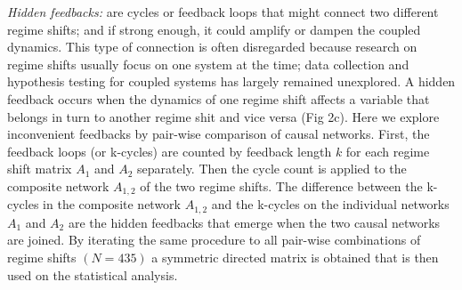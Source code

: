 \documentclass[9pt,]{article}
\begin{document}
\emph{Hidden feedbacks:} are cycles or feedback loops that might connect
two different regime shifts; and if strong enough, it could amplify or
dampen the coupled dynamics. This type of connection is often
disregarded because research on regime shifts usually focus on one
system at the time; data collection and hypothesis testing for coupled
systems has largely remained unexplored. A hidden feedback occurs when
the dynamics of one regime shift affects a variable that belongs in turn
to another regime shit and vice versa (Fig 2c). Here we explore
inconvenient feedbacks by pair-wise comparison of causal networks.
First, the feedback loops (or k-cycles) are counted by feedback length
\(k\) for each regime shift matrix \(A_1\) and \(A_2\) separately. Then
the cycle count is applied to the composite network \(A_{1,2}\) of the
two regime shifts. The difference between the k-cycles in the composite
network \(A_{1,2}\) and the k-cycles on the individual networks \(A_1\)
and \(A_2\) are the hidden feedbacks that emerge when the two causal
networks are joined. By iterating the same procedure to all pair-wise
combinations of regime shifts \((N=435)\) a symmetric directed matrix is
obtained that is then used on the statistical analysis.
\end{document}
